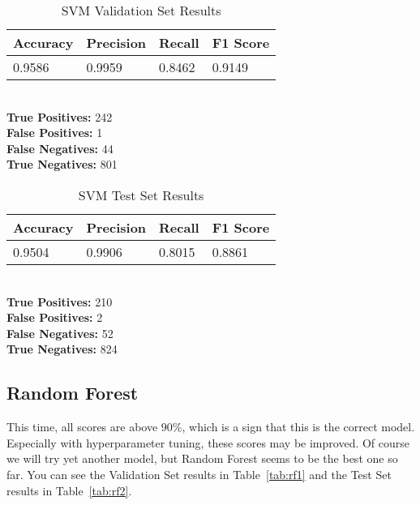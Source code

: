 \documentclass[conference]{IEEEtran}
\begin{document}
\begin{table}[H]
    \caption{SVM Validation Set Results}

    \begin{tabularx}{\linewidth}{|X|X|X|X|}
        \hline
        \textbf{Accuracy} & \textbf{Precision} & \textbf{Recall} & \textbf{F1 Score} \\
        \hline
        0.9586 & 0.9959 & 0.8462 & 0.9149 \\
        \hline
    \end{tabularx}\\

    \textbf{True Positives:} 242\\
    \textbf{False Positives:} 1\\
    \textbf{False Negatives:} 44\\
    \textbf{True Negatives:} 801
    \label{tab:svm1}
\end{table}

\begin{table}[H]
    \caption{SVM Test Set Results}

    \begin{tabularx}{\linewidth}{|X|X|X|X|}
        \hline
        \textbf{Accuracy} & \textbf{Precision} & \textbf{Recall} & \textbf{F1 Score} \\
        \hline
        0.9504 & 0.9906 & 0.8015 & 0.8861 \\
        \hline
    \end{tabularx}\\

    \textbf{True Positives:} 210\\
    \textbf{False Positives:} 2\\
    \textbf{False Negatives:} 52\\
    \textbf{True Negatives:} 824
    \label{tab:svm2}
\end{table}

\subsection{Random Forest}

This time, all scores are above $90\%$, which is a sign that this is the correct model. Especially with hyperparameter tuning, these scores may be improved. Of course we will try yet another model, but Random Forest seems to be the best one so far. You can see the Validation Set results in Table \ref{tab:rf1} and the Test Set results in Table \ref{tab:rf2}.
\end{document}
